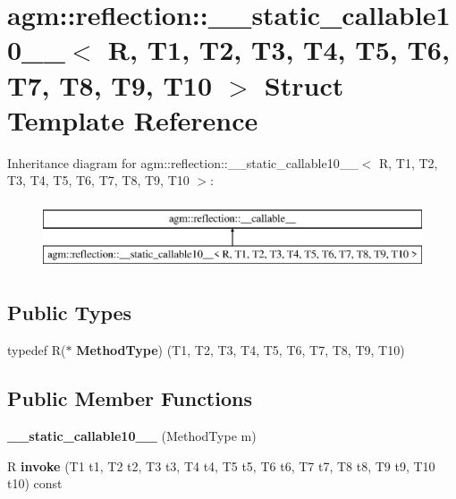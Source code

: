 \hypertarget{structagm_1_1reflection_1_1____static__callable10____}{}\section{agm\+:\+:reflection\+:\+:\+\_\+\+\_\+static\+\_\+callable10\+\_\+\+\_\+$<$ R, T1, T2, T3, T4, T5, T6, T7, T8, T9, T10 $>$ Struct Template Reference}
\label{structagm_1_1reflection_1_1____static__callable10____}
Inheritance diagram for agm\+:\+:reflection\+:\+:\+\_\+\+\_\+static\+\_\+callable10\+\_\+\+\_\+$<$ R, T1, T2, T3, T4, T5, T6, T7, T8, T9, T10 $>$\+:\begin{figure}[H]
\begin{center}
\leavevmode
\includegraphics[height=2.000000cm]{structagm_1_1reflection_1_1____static__callable10____}
\end{center}
\end{figure}
\subsection*{Public Types}
\begin{DoxyCompactItemize}
\item 
typedef R($\ast$ {\bfseries Method\+Type}) (T1, T2, T3, T4, T5, T6, T7, T8, T9, T10)\hypertarget{structagm_1_1reflection_1_1____static__callable10_____a80619dc0a05fc66e199506ef088fe459}{}\label{structagm_1_1reflection_1_1____static__callable10_____a80619dc0a05fc66e199506ef088fe459}

\end{DoxyCompactItemize}
\subsection*{Public Member Functions}
\begin{DoxyCompactItemize}
\item 
{\bfseries \+\_\+\+\_\+static\+\_\+callable10\+\_\+\+\_\+} (Method\+Type m)\hypertarget{structagm_1_1reflection_1_1____static__callable10_____a55d49f40d403961234cbf5682276b777}{}\label{structagm_1_1reflection_1_1____static__callable10_____a55d49f40d403961234cbf5682276b777}

\item 
R {\bfseries invoke} (T1 t1, T2 t2, T3 t3, T4 t4, T5 t5, T6 t6, T7 t7, T8 t8, T9 t9, T10 t10) const \hypertarget{structagm_1_1reflection_1_1____static__callable10_____a79749061cb95fd3a4ef41cd4fa5f2936}{}\label{structagm_1_1reflection_1_1____static__callable10_____a79749061cb95fd3a4ef41cd4fa5f2936}

\end{DoxyCompactItemize}
